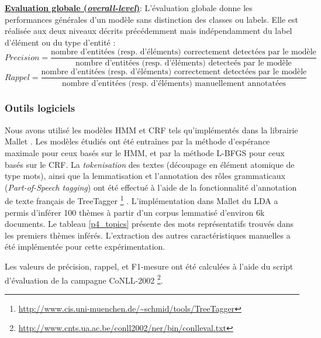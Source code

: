 \vspace{0.3cm}

\noindent \underline{\textbf{Evaluation globale (\textit{overall-level})}}: L'évaluation globale donne les performances générales d'un modèle sans distinction des classes ou labels. Elle est réalisée aux deux niveaux décrits précédemment mais indépendamment du label d'élément ou du type d'entité :
\[Precision = \frac{\text{nombre d'entitées (resp. d'éléments) correctement detectées par le modèle}} {\text{nombre d'entitées (resp. d'éléments) detecteés par le modèle}}\]
\[Rappel = \frac{\text{nombre d'entitées (resp. d'éléments) correctement detectées par le modèle}} {\text{nombre d'entitées (resp. d'éléments)  manuellement annotatées}}\]

\subsubsection{Outils logiciels}
Nous avons utilisé les modèles HMM et CRF tels qu'implémentés dans la librairie Mallet \citep{McCallum2012Mallet}. Les modèles étudiés ont été entraînes par la méthode d'espérance maximale pour ceux basés sur le HMM, et par la méthode L-BFGS pour ceux basés sur le CRF. La \textit{tokenisation} des textes (découpage en élément atomique de type mots), ainsi que la lemmatisation et l'annotation des rôles grammaticaux (\textit{Part-of-Speech tagging}) ont été effectué à l'aide de la fonctionnalité d'annotation de texte français de TreeTagger \footnote{\url{http://www.cis.uni-muenchen.de/~schmid/tools/TreeTagger}}  \citep{schmid1994treetagger}. L'implémentation dans Mallet du LDA \citep{blei2003lda} a permis d'inférer 100 thèmes à partir d'un corpus lemmatisé d'environ 6k documents. Le tableau \ref{p4_topics} 
présente des mots représentatifs trouvés dans les premiers thèmes inférés. L'extraction des autres caractéristiques manuelles a été implémentée pour cette expérimentation. 

Les valeurs de précision, rappel, et F1-mesure ont été calculées à l'aide du script d'évaluation de la campagne CoNLL-2002 \footnote{\url{http://www.cnts.ua.ac.be/conll2002/ner/bin/conlleval.txt}}.

